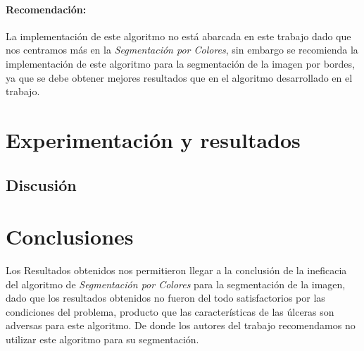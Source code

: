 \documentclass[a4paper,10pt,twocolumn]{article}
\begin{document}
\paragraph*{Recomendaci\'on:}
La implementaci\'on de este algoritmo no est\'a abarcada en este trabajo dado que nos centramos m\'as en la \textit{Segmentaci\'on por Colores},
sin embargo se recomienda la implementaci\'on de este algoritmo para la segmentaci\'on de la imagen por bordes, 
ya que se debe obtener mejores resultados que en el algoritmo desarrollado en el trabajo. 











 
 










\section{Experimentaci\'{o}n y resultados}
\subsection{Discusi\'{o}n}

\section{Conclusiones}\label{sec:conc}
 
Los Resultados obtenidos nos permitieron llegar a la conclusi\'on de la ineficacia del algoritmo de 
\textit{Segmentaci\'on por Colores} para la segmentaci\'on de la imagen, dado que los resultados obtenidos no
fueron del todo satisfactorios por las condiciones del problema, producto que las caracter\'isticas de las  
\'ulceras son adversas para este algoritmo. De donde los autores del trabajo recomendamos no utilizar este algoritmo para su segmentaci\'on.
\\
\\
\end{document}
